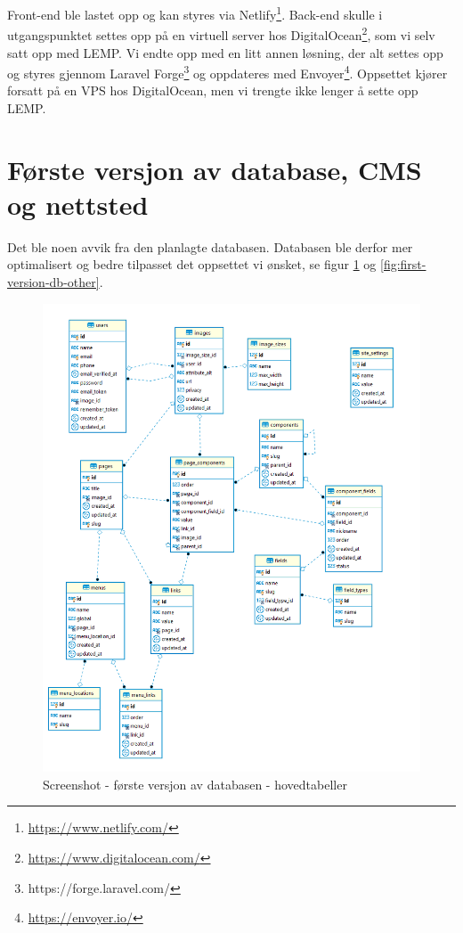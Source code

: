 Front-end ble lastet opp og kan styres via Netlify\footnote{\url{https://www.netlify.com/}}. Back-end skulle i utgangspunktet settes opp på en virtuell server hos DigitalOcean\footnote{\url{https://www.digitalocean.com/}}, som vi selv satt opp med LEMP. Vi endte opp med en litt annen løsning, der alt settes opp og styres gjennom Laravel Forge\footnote{https://forge.laravel.com/} og oppdateres med Envoyer\footnote{\url{https://envoyer.io/}}. Oppsettet kjører forsatt på en VPS hos DigitalOcean, men vi trengte ikke lenger å sette opp LEMP.

\section{Første versjon av database, CMS og nettsted}
Det ble noen avvik fra den planlagte databasen. Databasen ble derfor mer optimalisert og bedre tilpasset det oppsettet vi ønsket, se figur \ref{fig:first-version-db} og \ref{fig:first-version-db-other}.

\begin{figure}[H]
    \centering
    \includegraphics[width=\textwidth]{bjornar/db-endelig.png}
    \caption{Screenshot - første versjon av databasen - hovedtabeller}
    \label{fig:first-version-db}
\end{figure}

